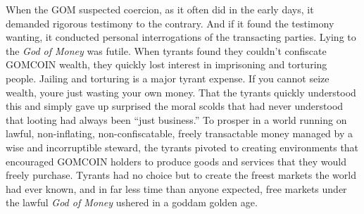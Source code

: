 When the GOM suspected coercion, as it often did in the early days, it
demanded rigorous testimony to the contrary. And if it found the
testimony wanting, it conducted personal interrogations of the
transacting parties. Lying to the \emph{God of Money} was futile. When
tyrants found they couldn't confiscate GOMCOIN wealth, they quickly lost
interest in imprisoning and torturing people. Jailing and torturing is a
major tyrant expense. If you cannot seize wealth, you\textquotesingle re
just wasting your own money. That the tyrants quickly understood this
and simply gave up surprised the moral scolds that had never understood
that looting had always been ``just business.'' To prosper in a world
running on lawful, non-inflating, non-confiscatable, freely transactable
money managed by a wise and incorruptible steward, the tyrants pivoted
to creating environments that encouraged GOMCOIN holders to produce
goods and services that they would freely purchase. Tyrants had no
choice but to create the freest markets the world had ever known, and in
far less time than anyone expected, free markets under the lawful
\emph{God of Money} ushered in a goddam golden age.



%

